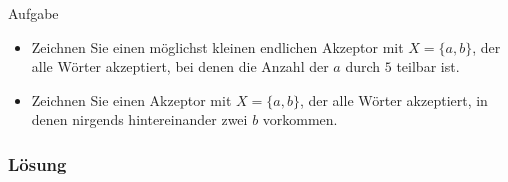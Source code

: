 \begin{frame}{Aufgabe}
	\begin{itemize}
		\item Zeichnen Sie einen möglichst kleinen endlichen Akzeptor mit $ X = \{a,b\}$, der alle Wörter akzeptiert, bei denen die Anzahl der $a$ durch $5$ teilbar ist.
		\item Zeichnen Sie einen Akzeptor mit $ X = \{a,b\}$, der alle Wörter akzeptiert, in denen nirgends hintereinander zwei $b$ vorkommen.
	\end{itemize}		
\end{frame}
\begin{frame} 
	\frametitle{Lösung}
\end{frame} 

